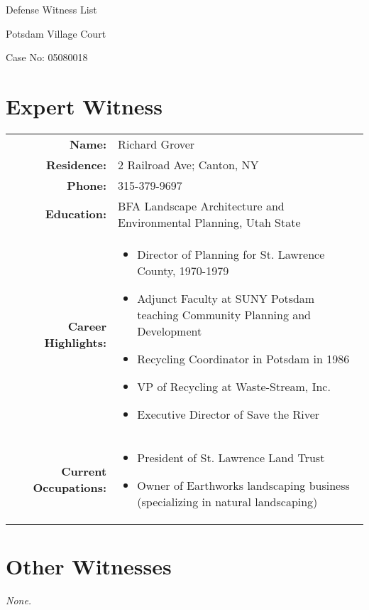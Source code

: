 \documentclass[12pt]{article}
\begin{document}
\begin{center}
{\Huge Defense Witness List}

Potsdam Village Court

Case No: 05080018
\end{center}


\section{Expert Witness}

\begin{tabular}{rl}
{\bf Name:} & Richard Grover\\
{\bf Residence:} & 2 Railroad Ave; Canton, NY\\
{\bf Phone:} & 315-379-9697 \\
{\bf Education:} & BFA Landscape Architecture and Environmental Planning, Utah State\\
{\bf Career Highlights:} & 
  \parbox[t]{4in}{\begin{itemize}
     \item Director of Planning for St. Lawrence County, 1970-1979
     \item Adjunct Faculty at SUNY Potsdam teaching Community Planning and Development
     \item Recycling Coordinator in Potsdam in 1986
     \item VP of Recycling at Waste-Stream, Inc.
     \item Executive Director of Save the River
     \end{itemize}
    }\\
{\bf Current Occupations:} &
  \parbox[t]{4in}{\begin{itemize}
     \item President of St. Lawrence Land Trust
     \item Owner of Earthworks landscaping business (specializing in natural landscaping)
     \end{itemize}
    }\\
\end{tabular}


\section{Other Witnesses}

{\em None.}
\end{document}
